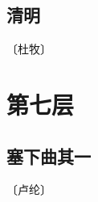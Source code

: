\documentclass[12pt,UTF-8,openany]{ctexbook}
\begin{document}
\vspace{8pt}


\section{清明}

\begin{center}
    \vspace{10pt}
    
    \begin{normalsize}
        
        〔杜牧〕
        
    \end{normalsize}
    
    \vspace{8pt}
    
    \begin{large}
        
        
        
    \end{large}
    
\end{center}

\vspace{8pt}


\chapter{第七层}

\section{塞下曲其一}

\begin{center}
    \vspace{10pt}
    
    \begin{normalsize}
        
        〔卢纶〕
        
    \end{normalsize}
    
    \vspace{8pt}
    
    \begin{large}
        
        
        
    \end{large}
    
\end{center}
\end{document}
